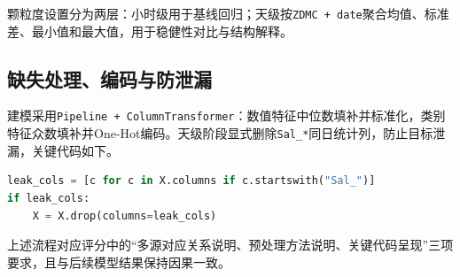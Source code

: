 颗粒度设置分为两层：小时级用于基线回归；天级按\texttt{ZDMC + date}聚合均值、标准差、最小值和最大值，用于稳健性对比与结构解释。

\subsection{缺失处理、编码与防泄漏}

建模采用\texttt{Pipeline + ColumnTransformer}：数值特征中位数填补并标准化，类别特征众数填补并One-Hot编码。天级阶段显式删除\texttt{Sal\_*}同日统计列，防止目标泄漏，关键代码如下。

\begin{lstlisting}[language=Python,caption={天级建模的目标泄漏防护},label={lst:anti-leak}]
leak_cols = [c for c in X.columns if c.startswith("Sal_")]
if leak_cols:
    X = X.drop(columns=leak_cols)
\end{lstlisting}

上述流程对应评分中的“多源对应关系说明、预处理方法说明、关键代码呈现”三项要求，且与后续模型结果保持因果一致\cite{rubric_2025}。
